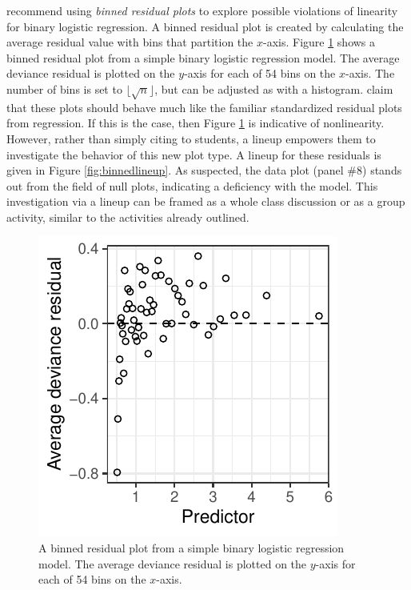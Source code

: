 \documentclass[12pt]{article}
\begin{document}
\citet{GelmanHill:2007} recommend using \emph{binned residual plots} to
explore possible violations of linearity for binary logistic regression.
A binned residual plot is created by calculating the average residual
value with bins that partition the \(x\)-axis. Figure \ref{fig:binned}
shows a binned residual plot from a simple binary logistic regression
model. The average deviance residual is plotted on the \(y\)-axis for
each of 54 bins on the \(x\)-axis. The number of bins is set to
\(\lfloor \sqrt{n} \rfloor\), but can be adjusted as with a histogram.
\citet{GelmanHill:2007} claim that these plots should behave much like
the familiar standardized residual plots from regression. If this is the
case, then Figure \ref{fig:binned} is indicative of nonlinearity.
However, rather than simply citing \citet{GelmanHill:2007} to students,
a lineup empowers them to investigate the behavior of this new plot
type. A lineup for these residuals is given in Figure
\ref{fig:binnedlineup}. As suspected, the data plot (panel \#8) stands
out from the field of null plots, indicating a deficiency with the
model. This investigation via a lineup can be framed as a whole class
discussion or as a group activity, similar to the activities already
outlined.

\begin{figure}
\centering
\includegraphics{figs/binned_resid_example.pdf}
\caption{\label{fig:binned} A binned residual plot from a simple binary
logistic regression model. The average deviance residual is plotted on
the \(y\)-axis for each of 54 bins on the \(x\)-axis.}
\end{figure}
\end{document}
